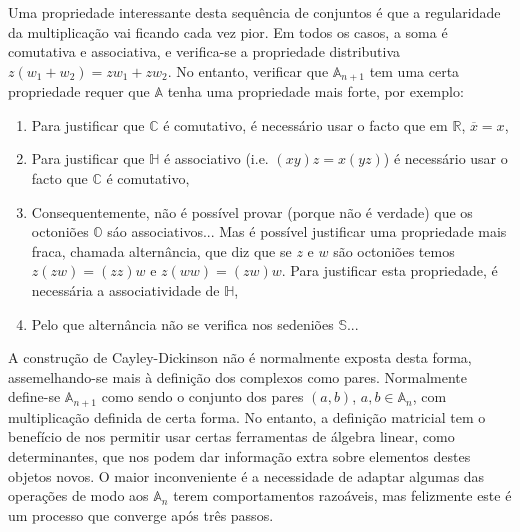 \documentclass{article}
\newcommand{\R}{\mathbb{R}}
\newcommand{\C}{\mathbb{C}}
\renewcommand{\H}{\mathbb{H}}
\renewcommand{\O}{\mathbb{O}}
\begin{document}
Uma propriedade interessante desta sequência de conjuntos é que a regularidade da multiplicação vai ficando cada vez pior. Em todos os casos, a soma é comutativa e associativa, e verifica-se a propriedade distributiva $z(w_1 + w_2) = z w_1 + z w_2$. No entanto, verificar que $\mathbb{A}_{n+1}$ tem uma certa propriedade requer que $\mathbb{A}$ tenha uma propriedade mais forte, por exemplo:
\begin{enumerate}[label=\roman*)]
\item Para justificar que $\C$ é comutativo, é necessário usar o facto que em $\R$, $\overline{x} = x$,
\item Para justificar que $\H$ é associativo (i.e. $(xy)z = x(yz)$) é necessário usar o facto que $\C$ é comutativo,
\item Consequentemente, não é possível provar (porque não é verdade) que os octoniões $\O$ sáo associativos... Mas é possível justificar uma propriedade mais fraca, chamada alternância, que diz que se $z$ e $w$ são octoniões temos $z(zw) = (zz)w$ e $z(ww) = (zw)w$. Para justificar esta propriedade, é necessária a associatividade de $\H$,
\item Pelo que alternância não se verifica nos sedeniões $\mathbb{S}$...
\end{enumerate}

A construção de Cayley-Dickinson não é normalmente exposta desta forma, assemelhando-se mais à definição dos complexos como pares. Normalmente define-se $\mathbb{A}_{n+1}$ como sendo o conjunto dos pares $(a,b)$, $a,b \in \mathbb{A}_n$, com multiplicação definida de certa forma. No entanto, a definição matricial tem o benefício de nos permitir usar certas ferramentas de álgebra linear, como determinantes, que nos podem dar informação extra sobre elementos destes objetos novos. O maior inconveniente é a necessidade de adaptar algumas das operações de modo aos $\mathbb{A}_n$ terem comportamentos razoáveis, mas felizmente este é um processo que converge após três passos.
\end{document}
